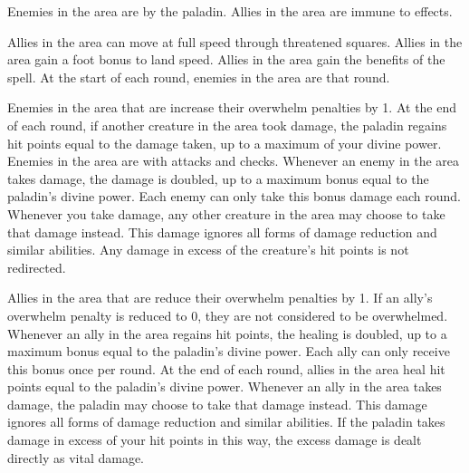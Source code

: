         Enemies in the area are \goaded by the paladin.
        Allies in the area are immune to  effects.

        Allies in the area can move at full speed through threatened squares.
        Allies in the area gain a  foot bonus to land speed.
        Allies in the area gain the benefits of the  spell.
        At the start of each round, enemies in the area are \disoriented that round.

        Enemies in the area that are  increase their overwhelm penalties by 1.
        At the end of each round, if another creature in the area took damage, the paladin regains hit points equal to the damage taken, up to a maximum of your divine power.
        Enemies in the area are \impaired with attacks and checks.
        Whenever an enemy in the area takes damage, the damage is doubled, up to a maximum bonus equal to the paladin's divine power.
        Each enemy can only take this bonus damage each round.
        Whenever you take damage, any other creature in the area may choose to take that damage instead.
        This damage ignores all forms of damage reduction and similar abilities.
        Any damage in excess of the creature's hit points is not redirected.

        Allies in the area that are  reduce their overwhelm penalties by 1.
        If an ally's overwhelm penalty is reduced to 0, they are not considered to be overwhelmed.
        Whenever an ally in the area regains hit points, the healing is doubled, up to a maximum bonus equal to the paladin's divine power.
        Each ally can only receive this bonus once per round.
        At the end of each round, allies in the area heal hit points equal to the paladin's divine power.
        Whenever an ally in the area takes damage, the paladin may choose to take that damage instead.
        This damage ignores all forms of damage reduction and similar abilities.
        If the paladin takes damage in excess of your hit points in this way, the excess damage is dealt directly as vital damage.

